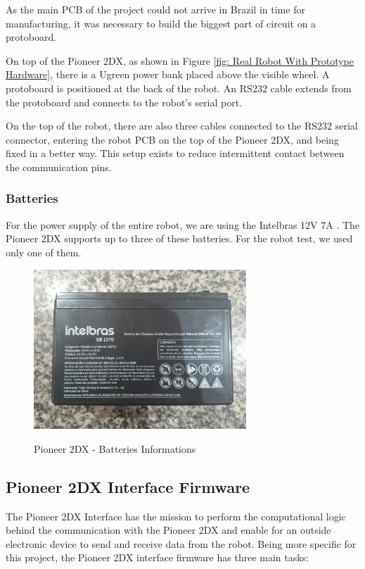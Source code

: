 \documentclass[../../monografia.tex]{subfiles}
\begin{document}
As the main PCB of the project could not arrive in Brazil in time for manufacturing, it was necessary to build the biggest part of circuit on a protoboard.

On top of the Pioneer 2DX, as shown in Figure \ref{fig: Real Robot With Prototype Hardware}, there is a Ugreen power bank \cite{ugreen_powerbank_24} placed above the visible wheel. A protoboard is positioned at the back of the robot. An RS232 cable extends from the protoboard and connects to the robot's serial port.

On the top of the robot, there are also three cables connected to the RS232 serial connector, entering the robot PCB on the top of the Pioneer 2DX, and being fixed in a better way. This setup exists to reduce intermittent contact between the communication pins.

\subsubsection{Batteries}

For the power supply of the entire robot, we are using the Intelbras 12V 7A \cite{intelbras_bateria_1270_24}. The Pioneer 2DX supports up to three of these batteries. For the robot test, we used only one of them.

\begin{figure}[!h]
    \centering
    \caption{Pioneer 2DX - Batteries Informations}
    \centering %
    \includegraphics[width=8cm]{batteries_info.jpg}
    \label{fig: Pioneer 2DX - Batteries Informations}
\end{figure}

\subsection{Pioneer 2DX Interface Firmware}

The Pioneer 2DX Interface has the mission to perform the computational logic behind the communication with the Pioneer 2DX and enable for an outside electronic device to send and receive data from the robot. Being more specific for this project, the Pioneer 2DX interface firmware has three main tasks:
\end{document}
